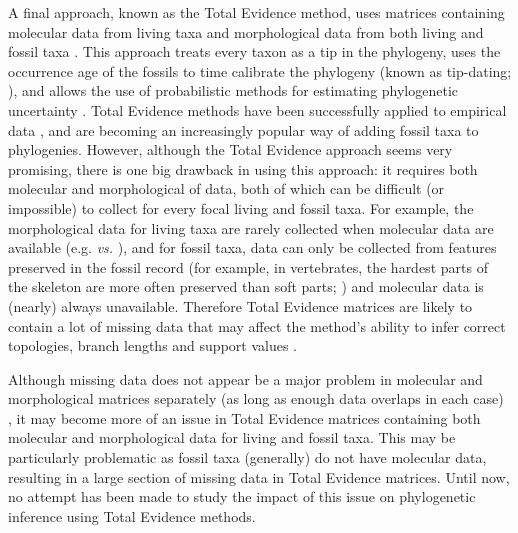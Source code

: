 \documentclass[12pt,letterpaper]{article}
\begin{document}
A final approach, known as the Total Evidence method, uses matrices containing molecular data from living taxa and morphological data from both living and fossil taxa \citep{eernissetaxonomic1993}. This approach treats every taxon as a tip in the phylogeny, uses the occurrence age of the fossils to time calibrate the phylogeny (known as tip-dating; \citealt{ronquista2012}), and allows the use of probabilistic methods for estimating phylogenetic uncertainty \citep{ronquista2012}. Total Evidence methods have been successfully applied to empirical data \citep[e.g.][]{pyrondivergence2011,ronquista2012,schragocombining2013,slaterphylogenetic2013,beckancient2014}, and are becoming an increasingly popular way of adding fossil taxa to phylogenies.
However, although the Total Evidence approach seems very promising, there is one big drawback in using this approach: it requires both molecular and morphological of data, both of which can be difficult (or impossible) to collect for every focal living and fossil taxa.
For example, the morphological data for living taxa are rarely collected when molecular data are available (e.g. \citealt{O'Leary08022013} \textit{vs.} \citealt{meredithimpacts2011}), and for fossil taxa, data can only be collected from features preserved in the fossil record (for example, in vertebrates, the hardest parts of the skeleton are more often preserved than soft parts; \citealt{sansomfossilization2013}) and molecular data is (nearly) always unavailable. Therefore Total Evidence matrices are likely to contain a lot of missing data that may affect the method's ability to infer correct topologies, branch lengths and support values \citep{salamin2003}. 

Although missing data does not appear be a major problem in molecular and morphological matrices separately (as long as enough data overlaps in each case)
 \citep{wiensmissing2003,wiensmissing2006,wiensmissing2008,rouresite-specific2011,Sanderson22072011,pattinsonphylogeny2014}, it may become more of an issue in Total Evidence matrices containing both molecular and morphological data for living and fossil taxa. This may be particularly problematic as fossil taxa (generally) do not have molecular data, resulting in a large section of missing data in Total Evidence matrices. Until now, no attempt has been made to study the impact of this issue on phylogenetic inference using Total Evidence methods.
\end{document}
